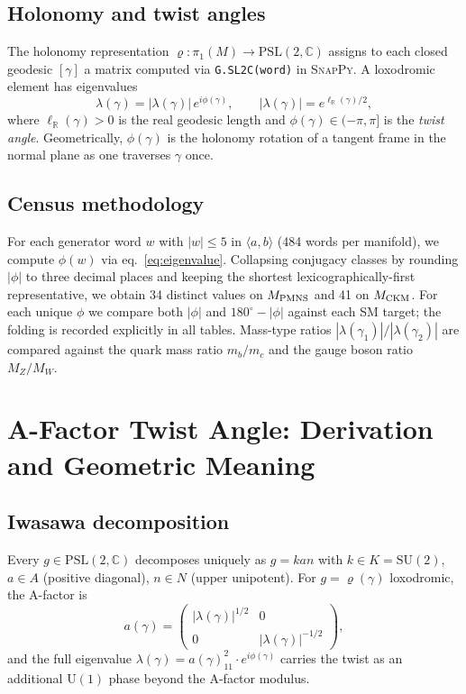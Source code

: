 \documentclass[11pt,a4paper]{article}
\newcommand{\PSL}{\mathrm{PSL}(2,\mathbb{C})}
\newcommand{\pioneM}{\pi_1(M)}
\newcommand{\degr}{^{\circ}}
\begin{document}
\subsection{Holonomy and twist angles}

The holonomy representation $\varrho:\pioneM\to\PSL$ assigns to each closed
geodesic $[\gamma]$ a matrix computed via \texttt{G.SL2C(word)} in \textsc{SnapPy}.
A loxodromic element has eigenvalues
\begin{equation}
  \lambda(\gamma) = |\lambda(\gamma)|\,e^{i\phi(\gamma)},\qquad
  |\lambda(\gamma)| = e^{\ell_{\mathbb{R}}(\gamma)/2},
  \label{eq:eigenvalue}
\end{equation}
where $\ell_{\mathbb{R}}(\gamma)>0$ is the real geodesic length and
$\phi(\gamma)\in(-\pi,\pi]$ is the \emph{twist angle}.
Geometrically, $\phi(\gamma)$ is the holonomy rotation of a tangent frame
in the normal plane as one traverses $\gamma$ once.

\subsection{Census methodology}

For each generator word $w$ with $|w|\leq 5$ in $\langle a,b\rangle$ (484 words per manifold),
we compute $\phi(w)$ via eq.~\eqref{eq:eigenvalue}.
Collapsing conjugacy classes by rounding $|\phi|$ to three decimal places and
keeping the shortest lexicographically-first representative, we obtain
34 distinct values on $M_{\rm PMNS}$ and 41 on $M_{\rm CKM}$.
For each unique $\phi$ we compare both $|\phi|$ and $180\degr-|\phi|$
against each SM target; the folding is recorded explicitly in all tables.
Mass-type ratios $|\lambda(\gamma_1)|/|\lambda(\gamma_2)|$ are compared against
the quark mass ratio $m_b/m_c$ and the gauge boson ratio $M_Z/M_W$.

\section{A-Factor Twist Angle: Derivation and Geometric Meaning}
\label{sec:derivation}

\subsection{Iwasawa decomposition}

Every $g\in\PSL$ decomposes uniquely as $g=kan$ with
$k\in K=\mathrm{SU}(2)$, $a\in A$ (positive diagonal), $n\in N$ (upper
unipotent).
For $g=\varrho(\gamma)$ loxodromic, the A-factor is
\begin{equation}
  a(\gamma) =
  \begin{pmatrix}|\lambda(\gamma)|^{1/2}&0\\0&|\lambda(\gamma)|^{-1/2}\end{pmatrix},
\end{equation}
and the full eigenvalue $\lambda(\gamma)=a(\gamma)_{\!11}^2\cdot e^{i\phi(\gamma)}$
carries the twist as an additional $\mathrm{U}(1)$ phase beyond the A-factor modulus.
\end{document}
